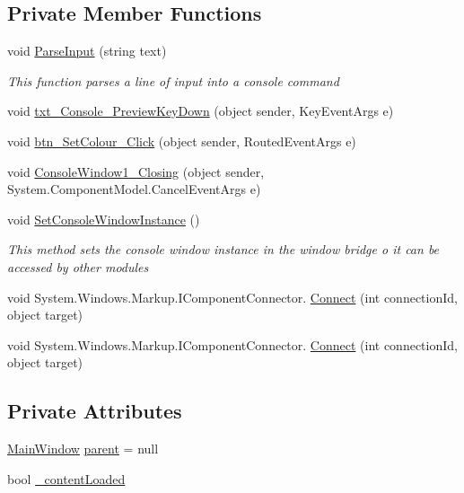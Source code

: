 \subsection*{Private Member Functions}
\begin{DoxyCompactItemize}
\item 
void \hyperlink{class_c_p_u___o_s___simulator_1_1_console_window_a0a66aa7f0e333cc919589a7ce4d584c0}{Parse\+Input} (string text)
\begin{DoxyCompactList}\small\item\em This function parses a line of input into a console command \end{DoxyCompactList}\item 
void \hyperlink{class_c_p_u___o_s___simulator_1_1_console_window_aabd331e8c3a83c87ccd2e09c3959408d}{txt\+\_\+\+Console\+\_\+\+Preview\+Key\+Down} (object sender, Key\+Event\+Args e)
\item 
void \hyperlink{class_c_p_u___o_s___simulator_1_1_console_window_a1de6be8bb7f4f581a9e4131a0408e632}{btn\+\_\+\+Set\+Colour\+\_\+\+Click} (object sender, Routed\+Event\+Args e)
\item 
void \hyperlink{class_c_p_u___o_s___simulator_1_1_console_window_a3d026ba3c0def2d09cc0dd1e92e4cd0d}{Console\+Window1\+\_\+\+Closing} (object sender, System.\+Component\+Model.\+Cancel\+Event\+Args e)
\item 
void \hyperlink{class_c_p_u___o_s___simulator_1_1_console_window_a8719d25b2617a32a78511d9e584d90a0}{Set\+Console\+Window\+Instance} ()
\begin{DoxyCompactList}\small\item\em This method sets the console window instance in the window bridge o it can be accessed by other modules \end{DoxyCompactList}\item 
void System.\+Windows.\+Markup.\+I\+Component\+Connector. \hyperlink{class_c_p_u___o_s___simulator_1_1_console_window_a8fc3e3f38ff00f6239dca33ff68de0d2}{Connect} (int connection\+Id, object target)
\item 
void System.\+Windows.\+Markup.\+I\+Component\+Connector. \hyperlink{class_c_p_u___o_s___simulator_1_1_console_window_a8fc3e3f38ff00f6239dca33ff68de0d2}{Connect} (int connection\+Id, object target)
\end{DoxyCompactItemize}
\subsection*{Private Attributes}
\begin{DoxyCompactItemize}
\item 
\hyperlink{class_c_p_u___o_s___simulator_1_1_main_window}{Main\+Window} \hyperlink{class_c_p_u___o_s___simulator_1_1_console_window_a1e38326bb40f4ed44c4964d94dc6f809}{parent} = null
\item 
bool \hyperlink{class_c_p_u___o_s___simulator_1_1_console_window_a4836f04e93faa3749609d7eba72e1712}{\+\_\+content\+Loaded}
\end{DoxyCompactItemize}


